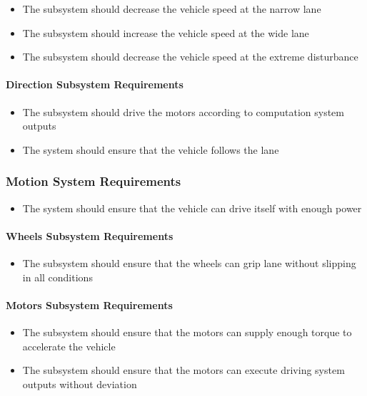 \documentclass[a4paper,12pt]{article}
\begin{document}
		\begin{itemize}
			\item The subsystem should decrease the vehicle speed at the narrow lane 
			\item The subsystem should increase the vehicle speed at the wide lane 
			\item The subsystem should decrease the vehicle speed at the extreme disturbance  
		\end{itemize}
		
	\paragraph{Direction Subsystem Requirements}
	
		\begin{itemize}
			\item The subsystem should drive the motors according to computation system outputs
			\item The system should ensure that the vehicle follows the lane 
		\end{itemize}


	\subsubsection{Motion System Requirements}
	
		\begin{itemize}
			\item The system should	ensure that the vehicle can drive itself with enough power
		\end{itemize}
	
	\paragraph{Wheels Subsystem Requirements}	
		
		\begin{itemize}
			\item The subsystem should ensure that the wheels can grip lane without slipping in all conditions 	
		\end{itemize}
		
	\paragraph{Motors Subsystem Requirements}
	
		\begin{itemize}
			\item The subsystem should ensure that the motors can supply enough torque to accelerate the vehicle		
			\item  The subsystem should ensure that the motors can execute driving system outputs without deviation 
		\end{itemize}
	
\end{document}
